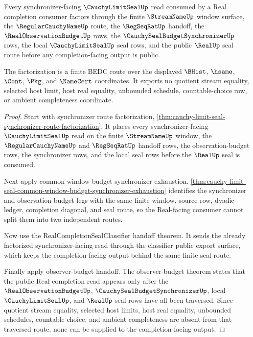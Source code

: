 \begin{theorem}
\label{thm:cauchy-limit-seal-synchronizer-observer-real-seal-factorization}
Every synchronizer-facing $\CauchyLimitSealUp$ read consumed by a Real completion consumer factors through the finite $\StreamNameUp$ window surface, the $\RegularCauchyNameUp$ route, the $\RegSeqRatUp$ handoff, the $\RealObservationBudgetUp$ rows, the $\CauchySealBudgetSynchronizerUp$ rows, the local $\CauchyLimitSealUp$ seal rows, and the public $\RealUp$ seal route before any completion-facing output is public.

The factorization is a finite BEDC route over the displayed $\BHist$, $\hsame$, $\Cont$, $\Pkg$, and $\NameCert$ coordinates. It exports no quotient stream equality, selected host limit, host real equality, unbounded schedule, countable-choice row, or ambient completeness coordinate.
\end{theorem}
\begin{proof}
Start with synchronizer route factorization, \autoref{thm:cauchy-limit-seal-synchronizer-route-factorization}. It places every synchronizer-facing $\CauchyLimitSealUp$ read on the finite $\StreamNameUp$ window, the $\RegularCauchyNameUp$ and $\RegSeqRatUp$ handoff rows, the observation-budget rows, the synchronizer rows, and the local seal rows before the $\RealUp$ seal is consumed.

Next apply common-window budget synchronizer exhaustion. \autoref{thm:cauchy-limit-seal-common-window-budget-synchronizer-exhaustion} identifies the synchronizer and observation-budget legs with the same finite window, source row, dyadic ledger, completion diagonal, and seal route, so the Real-facing consumer cannot split them into two independent routes.

Now use the RealCompletionSealClassifier handoff theorem. It sends the already factorized synchronizer-facing read through the classifier public export surface, which keeps the completion-facing output behind the same finite seal route.

Finally apply observer-budget handoff. The observer-budget theorem states that the public Real completion read appears only after the $\RealObservationBudgetUp$, $\CauchySealBudgetSynchronizerUp$, local $\CauchyLimitSealUp$, and $\RealUp$ seal rows have all been traversed. Since quotient stream equality, selected host limits, host real equality, unbounded schedules, countable choice, and ambient completeness are absent from that traversed route, none can be supplied to the completion-facing output.
\end{proof}

